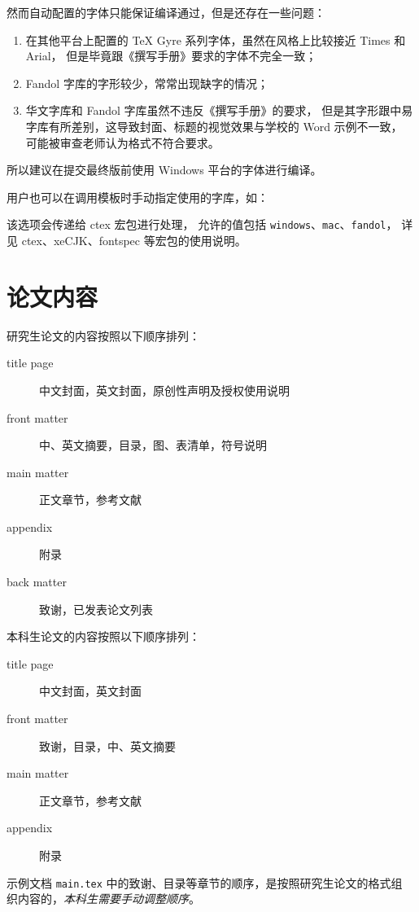 \documentclass[a4paper]{ltxdoc}
\DeclareRobustCommand\file{\nolinkurl}
\DeclareRobustCommand\pkg{\textsf}
\DeclareRobustCommand\opt{\texttt}
\begin{document}
然而自动配置的字体只能保证编译通过，但是还存在一些问题：
\begin{enumerate}
  \item 在其他平台上配置的 TeX Gyre 系列字体，虽然在风格上比较接近 Times 和 Arial，
    但是毕竟跟《撰写手册》要求的字体不完全一致；
  \item Fandol 字库的字形较少，常常出现缺字的情况；
  \item 华文字库和 Fandol 字库虽然不违反《撰写手册》的要求，
    但是其字形跟中易字库有所差别，这导致封面、标题的视觉效果与学校的 Word 示例不一致，
    可能被审查老师认为格式不符合要求。
\end{enumerate}

所以建议在提交最终版前使用 Windows 平台的字体进行编译。

用户也可以在调用模板时手动指定使用的字库，如：
该选项会传递给 \pkg{ctex} 宏包进行处理，
允许的值包括 \opt{windows}、\opt{mac}、\opt{fandol}，
详见 \pkg{ctex}、\pkg{xeCJK}、\pkg{fontspec} 等宏包的使用说明。



\section{论文内容}

研究生论文的内容按照以下顺序排列：
\begin{description}
  \item[title page] 中文封面，英文封面，原创性声明及授权使用说明
  \item[front matter] 中、英文摘要，目录，图、表清单，符号说明
  \item[main matter] 正文章节，参考文献
  \item[appendix] 附录
  \item[back matter] 致谢，已发表论文列表
\end{description}

本科生论文的内容按照以下顺序排列：
\begin{description}
  \item[title page] 中文封面，英文封面
  \item[front matter] 致谢，目录，中、英文摘要
  \item[main matter] 正文章节，参考文献
  \item[appendix] 附录
\end{description}

示例文档 \file{main.tex} 中的致谢、目录等章节的顺序，是按照研究生论文的格式组
织内容的，\emph{本科生需要手动调整顺序}。
\end{document}
